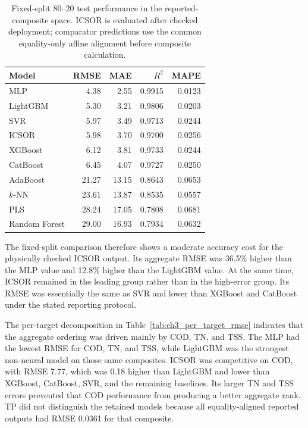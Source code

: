 \documentclass[12pt, twoside]{book}
\begin{document}
\begin{table}[htbp]
\centering
\caption[Fixed-split Chapter 3 test performance]{Fixed-split 80--20 test performance in the reported-composite space. ICSOR is evaluated after checked deployment; comparator predictions use the common equality-only affine alignment before composite calculation.}
\label{tab:ch3_fixed_split_performance}
\scriptsize
\setlength{\tabcolsep}{5pt}
\begin{tabular}{lrrrr}
\toprule
Model & RMSE & MAE & \(R^2\) & MAPE \\
\midrule
MLP & 4.38 & 2.55 & 0.9915 & 0.0123 \\
LightGBM & 5.30 & 3.21 & 0.9806 & 0.0203 \\
SVR & 5.97 & 3.49 & 0.9713 & 0.0244 \\
ICSOR & 5.98 & 3.70 & 0.9700 & 0.0256 \\
XGBoost & 6.12 & 3.81 & 0.9733 & 0.0244 \\
CatBoost & 6.45 & 4.07 & 0.9727 & 0.0250 \\
AdaBoost & 21.27 & 13.15 & 0.8643 & 0.0653 \\
\(k\)-NN & 23.61 & 13.87 & 0.8535 & 0.0557 \\
PLS & 28.24 & 17.05 & 0.7808 & 0.0681 \\
Random Forest & 29.00 & 16.93 & 0.7934 & 0.0632 \\
\bottomrule
\end{tabular}
\end{table}

The fixed-split comparison therefore shows a moderate accuracy cost for the physically checked ICSOR output.
Its aggregate RMSE was 36.5\% higher than the MLP value and 12.8\% higher than the LightGBM value. At the same
time, ICSOR remained in the leading group rather than in the high-error group. Its RMSE was essentially the
same as SVR and lower than XGBoost and CatBoost under the stated reporting protocol.

The per-target decomposition in Table~\ref{tab:ch3_per_target_rmse} indicates that the aggregate ordering was
driven mainly by COD, TN, and TSS. The MLP had the lowest RMSE for COD, TN, and TSS, while LightGBM was the
strongest non-neural model on those same composites. ICSOR was competitive on COD, with RMSE 7.77, which was
0.18 higher than LightGBM and lower than XGBoost, CatBoost, SVR, and the remaining baselines. Its larger TN
and TSS errors prevented that COD performance from producing a better aggregate rank. TP did not distinguish
the retained models because all equality-aligned reported outputs had RMSE 0.0361 for that composite.
\end{document}
